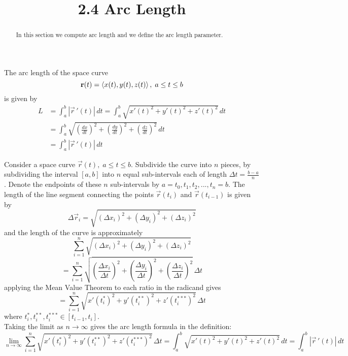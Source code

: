 \documentclass[handout]{ximera}
\title{2.4 Arc Length}
\begin{document}
\begin{abstract}
In this section we compute arc length and we define the arc length parameter.
\end{abstract}

\maketitle


\begin{definition}
The arc length of the space curve
\[
\mathbf r(t) = \left\langle x(t), y(t), z(t)\right\rangle, \; a \leq t \leq b
\]
is given by
\begin{align*}
L &= \int_a^b |\vec r\,'(t)|\, dt = \int_a^b \sqrt{x'(t)^2 + y'(t)^2 +z'(t)^2}\, dt \\
&= \int_a^b \sqrt{\left(\frac{dx}{dt}\right)^2 + \left(\frac{dy}{dt}\right)^2 +\left(\frac{dz}{dt}\right)^2}\, dt\\
&= \int_a^b |\vec r\,'(t)| \, dt
\end{align*}

\end{definition}


Consider a space curve $\vec r(t), \; a \leq t \leq b$.  Subdivide the curve into $n$ pieces, by subdividing the interval $[a, b]$ into $n$ equal 
sub-intervals each of length $\Delta t = \frac{b-a}{n}$. Denote the endpoints of these $n$ sub-intervals by $a = t_0, t_1, t_2, ..., t_n = b$.
The length of the line segment connecting the points $\vec r(t_i)$ and $\vec r(t_{i-1})$ is given by
\[
\Delta \vec r_i = \sqrt{(\Delta x_i) ^2 + (\Delta y_i)^2 + (\Delta z_i)^2}
\]
and the length of the curve is approximately
\[
\sum_{i = 1}^n \sqrt{(\Delta x_i) ^2 + (\Delta y_i)^2 + (\Delta z_i)^2}
\]
\[
= \sum_{i = 1}^n \sqrt{\left(\frac{\Delta x_i}{\Delta t}\right)^2 + \left(\frac{\Delta y_i}{\Delta t}\right)^2 + \left(\frac{\Delta z_i}{\Delta t}\right)^2}\, \Delta t
\]
applying the Mean Value Theorem to each ratio in the radicand gives
\[
= \sum_{i = 1}^n \sqrt{x'(t_i^*)^2 + y'(t_i^{**})^2 + z'(t_i^{***})^2} \,\Delta t
\]
where $t_i^*, t_i^{**}, t_i^{***} \in [t_{i-1}, t_i]$.\\
Taking the limit as $n \to \infty$ gives the arc length formula in the definition:
\[
\lim_{n \to \infty} \sum_{i = 1}^n \sqrt{x'(t_i^*)^2 + y'(t_i^{**})^2 + z'(t_i^{***})^2} \,\Delta t  = \int_a^b \sqrt{x'(t)^2 + y'(t)^2 +z'(t)^2}\, dt  = \int_a^b |\vec r\,'(t)|\, dt
\]
\end{document}
